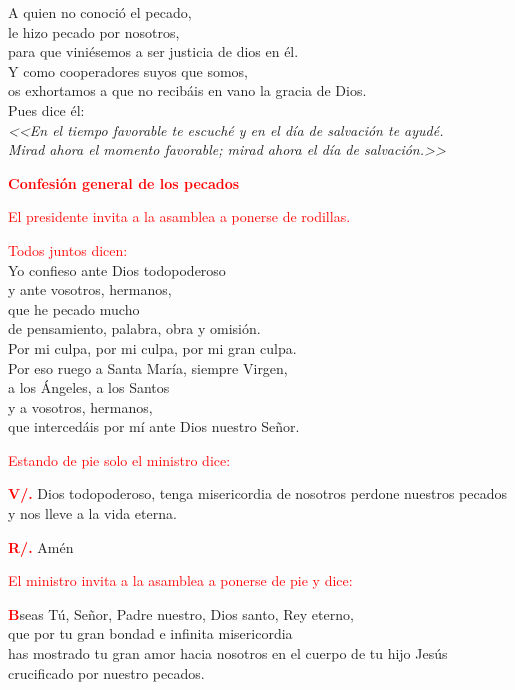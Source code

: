\documentclass[12pt, letterpaper]{report}
\begin{document}
\noindent
\Large {A quien no conoci\'o el pecado,\\
le hizo pecado por nosotros,\\
para que vini\'esemos a ser justicia de dios en \'el.\\
Y como cooperadores suyos que somos,\\
os exhortamos a que no recib\'ais en vano la gracia de Dios.\\
Pues dice \'el:\\
\em <<En el tiempo favorable te escuch\'e y en el d\'ia de salvaci\'on te ayud\'e.\\
Mirad ahora el momento favorable; mirad ahora el d\'ia de salvaci\'on.>>
}

\newpage

\Large {\bfseries \textcolor{red}{Confesi\'on general de los pecados}}

\large {\textcolor{red}{El presidente invita a la asamblea a ponerse de rodillas.}}

\large {\textcolor{red}{Todos juntos dicen:}}\\
\Large {Yo confieso ante Dios todopoderoso\\
y ante vosotros, hermanos,\\
que he pecado mucho\\
de pensamiento, palabra, obra y omisi\'on.\\
Por mi culpa, por mi culpa, por mi gran culpa.\\
Por eso ruego a Santa Mar\'ia, siempre Virgen,\\
a los \'Angeles, a los Santos\\
y a vosotros, hermanos,\\
que interced\'ais por m\'i ante Dios nuestro Se\~nor.}

\large {\textcolor{red}{Estando de pie solo el ministro dice:}}

\noindent
\Large {\bfseries \textcolor{red}{V/.}}\Large { Dios todopoderoso, tenga misericordia de nosotros
perdone nuestros pecados y nos lleve a la vida eterna.}

\noindent
\Large {\bfseries \textcolor{red}{R/.}} \hspace{0.5cm} Am\'en

\large {\textcolor{red}{El ministro invita a la asamblea a ponerse de pie y dice:}}

\lettrine[lines=2]{\bfseries \textcolor{red}{B}}{}\Large {seas T\'u, Se\~nor, Padre nuestro, Dios santo, Rey eterno,\\
que por tu gran bondad e infinita misericordia\\
has mostrado tu gran amor hacia nosotros en el cuerpo de tu hijo Jes\'us\\
crucificado por nuestro pecados.}
\end{document}
